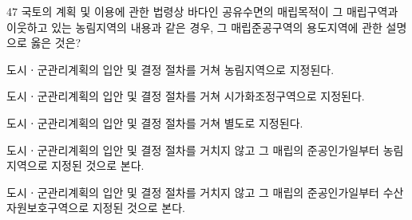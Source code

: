 \begin{question}{47}
국토의 계획 및 이용에 관한 법령상 바다인 공유수면의 매립목적이 그 매립구역과 이웃하고 있는 농림지역의 내용과 같은 경우, 그 매립준공구역의 용도지역에 관한 설명으로 옳은 것은?
\begin{choices}
  \item 도시ㆍ군관리계획의 입안 및 결정 절차를 거쳐 농림지역으로 지정된다.
  \item 도시ㆍ군관리계획의 입안 및 결정 절차를 거쳐 시가화조정구역으로 지정된다.
  \item 도시ㆍ군관리계획의 입안 및 결정 절차를 거쳐 별도로 지정된다.
  \item 도시ㆍ군관리계획의 입안 및 결정 절차를 거치지 않고 그 매립의 준공인가일부터 농림지역으로 지정된 것으로 본다.
  \item 도시ㆍ군관리계획의 입안 및 결정 절차를 거치지 않고 그 매립의 준공인가일부터 수산자원보호구역으로 지정된 것으로 본다.
\end{choices}
\end{question}
